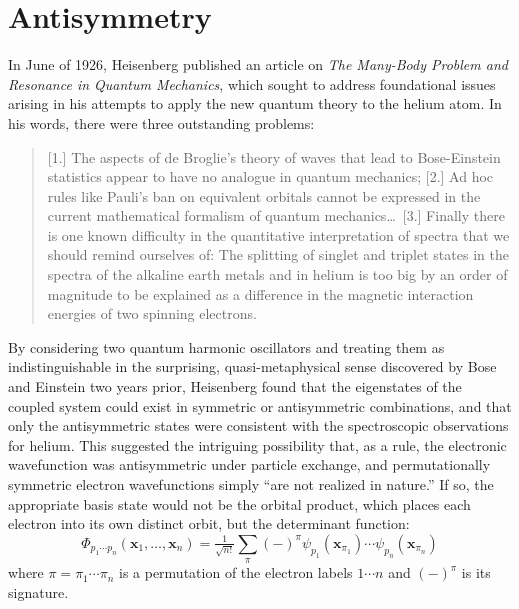 \section{Antisymmetry}

In June of 1926, Heisenberg published an article on {\itshape The Many-Body
Problem and Resonance in Quantum Mechanics}, which sought to address
foundational issues arising in his attempts to apply the new quantum theory to
the helium atom.
In his words, there were three outstanding problems:
\begin{quote}
    [1.] The aspects of de Broglie's theory of waves that lead to Bose-Einstein
    statistics appear to have no analogue in quantum mechanics;
    [2.] Ad hoc rules like Pauli's ban on equivalent orbitals cannot be
    expressed in the current mathematical formalism of quantum mechanics\dots\ 
    [3.] Finally there is one known difficulty in the quantitative
    interpretation of spectra that we should remind ourselves of:
    The splitting of singlet and triplet states in the spectra of the alkaline
    earth metals and in helium is too big by an order of magnitude to be
    explained as a difference in the magnetic interaction energies of two
    spinning electrons.\cite{Heisenberg:1926p411}
\end{quote}
By considering two quantum harmonic oscillators and treating them as
indistinguishable in the surprising, quasi-metaphysical\cite{French:1988p233}
sense discovered by Bose\cite{Bose:1924p178} and
Einstein\cite{Einstein:1924p261} two years prior, Heisenberg found that the
eigenstates of the coupled system could exist in symmetric or antisymmetric
combinations, and that only the antisymmetric states were consistent with the
spectroscopic observations for helium.
This suggested the intriguing possibility that, as a rule, the electronic
wavefunction was antisymmetric under particle exchange, and permutationally
symmetric electron wavefunctions simply ``are not realized in
nature.''\cite{Heisenberg:1926p411}
If so, the appropriate basis state would not be the orbital product, which
places each electron into its own distinct orbit, but the determinant function:
\begin{equation}
    \Phi_{p_1\cdots p_n}(\mathbf{x}_1, \ldots, \mathbf{x}_n)
    =
    \tfrac{1}{\sqrt{n!}}
    \sum_\pi
    (-)^\pi
    \psi_{p_1}(\mathbf{x}_{\pi_1})
    \cdots
    \psi_{p_n}(\mathbf{x}_{\pi_n})
\end{equation}
where \(\pi=\pi_1\cdots \pi_n\) is a permutation of the electron labels
\(1\cdots n\) and \((-)^\pi\) is its signature.
